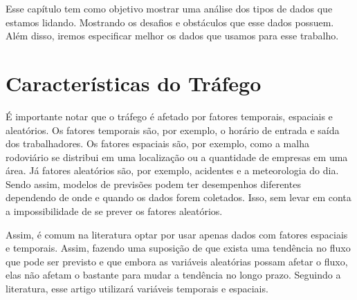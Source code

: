 







Esse capítulo tem como objetivo mostrar uma análise dos tipos de dados que estamos lidando. Mostrando os desafios e obstáculos que esse dados possuem. Além disso, iremos especificar melhor os dados que usamos para esse trabalho.

\section{Características do Tráfego}

É importante notar que o tráfego é afetado por fatores temporais, espaciais e aleatórios. Os fatores temporais são, por exemplo, o horário de entrada e saída dos trabalhadores. Os fatores espaciais são, por exemplo, como a malha rodoviário se distribui em uma localização ou a quantidade de empresas em uma área. Já fatores aleatórios são, por exemplo, acidentes e a meteorologia do dia. Sendo assim, modelos de previsões podem ter desempenhos diferentes dependendo de onde e quando os dados forem coletados. Isso, sem levar em conta a impossibilidade de se prever os fatores aleatórios.

Assim, é comum na literatura optar por usar apenas dados com fatores espaciais e temporais. Assim, fazendo uma suposição de que exista uma tendência no fluxo que pode ser previsto e que embora as variáveis aleatórias possam afetar o fluxo, elas não afetam o bastante para mudar a tendência no longo prazo. Seguindo a literatura, esse artigo utilizará variáveis temporais e espaciais.


